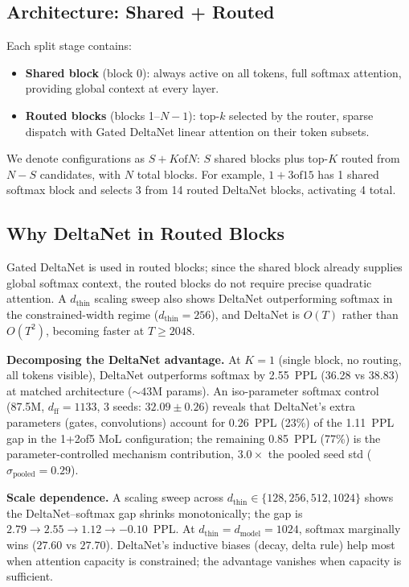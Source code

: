 \documentclass[10pt]{article}
\newcommand{\dmodel}{d_\text{model}}
\newcommand{\dthin}{d_\text{thin}}
\newcommand{\Paragraph}[1]{\vspace{0.5em}\noindent\textbf{#1}}
\begin{document}
\subsection{Architecture: Shared + Routed}

Each split stage contains:
\begin{itemize}[nosep]
\item \textbf{Shared block} (block 0): always active on all tokens, full softmax attention, providing global context at every layer.
\item \textbf{Routed blocks} (blocks 1--$N{-}1$): top-$k$ selected by the router, sparse dispatch with Gated DeltaNet \citep{yang2024gated} linear attention on their token subsets.
\end{itemize}

We denote configurations as $S{+}K\text{of}N$: $S$ shared blocks plus top-$K$ routed from $N{-}S$ candidates, with $N$ total blocks.
For example, $1{+}3\text{of}15$ has 1 shared softmax block and selects 3 from 14 routed DeltaNet blocks, activating 4 total.

\subsection{Why DeltaNet in Routed Blocks}

Gated DeltaNet is used in routed blocks; since the shared block already supplies global softmax context, the routed blocks do not require precise quadratic attention.
A $\dthin$ scaling sweep also shows DeltaNet outperforming softmax in the constrained-width regime ($\dthin{=}256$), and DeltaNet is $O(T)$ rather than $O(T^2)$, becoming faster at $T \geq 2048$.

\Paragraph{Decomposing the DeltaNet advantage.}
At $K{=}1$ (single block, no routing, all tokens visible), DeltaNet outperforms softmax by 2.55~PPL (36.28 vs 38.83) at matched architecture (${\sim}43$M params).
An iso-parameter softmax control (87.5M, $d_\text{ff}{=}1133$, 3 seeds: $32.09 \pm 0.26$) reveals that DeltaNet's extra parameters (gates, convolutions) account for 0.26~PPL (23\%) of the 1.11~PPL gap in the 1+2of5 MoL configuration; the remaining 0.85~PPL (77\%) is the parameter-controlled mechanism contribution, $3.0\times$ the pooled seed std ($\sigma_\text{pooled}{=}0.29$).

\Paragraph{Scale dependence.}
A scaling sweep across $\dthin \in \{128, 256, 512, 1024\}$ shows the DeltaNet--softmax gap shrinks monotonically; the gap is $2.79 \to 2.55 \to 1.12 \to {-}0.10$~PPL.
At $\dthin{=}\dmodel{=}1024$, softmax marginally wins ($27.60$ vs $27.70$).
DeltaNet's inductive biases (decay, delta rule) help most when attention capacity is constrained; the advantage vanishes when capacity is sufficient.
\end{document}
